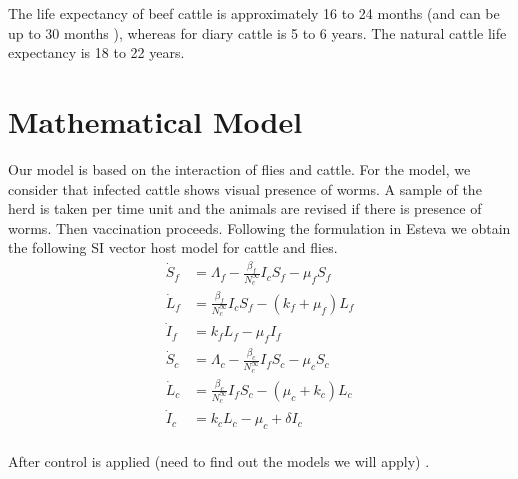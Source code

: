 \documentclass[preprint,12pt]{elsarticle}
\begin{document}
\noindent The life expectancy of beef cattle is approximately 16 to 24 months (and can be up to 30 months \cite{stanley:2003}), whereas for diary cattle is 5 to 6 years. The natural cattle life expectancy is 18 to 22 years.


\section{Mathematical Model}

\noindent Our model is based on the interaction of flies and cattle. For the model, we consider that infected cattle shows visual presence of worms. A sample of the herd is taken per time unit and the animals are revised if there is presence of worms. Then vaccination proceeds.  
Following the formulation in Esteva \cite{Esteva:1998} we obtain the 
following SI vector host model for cattle and flies.
\begin{equation}\label{Eq:SIvectorhostmodel}
\begin{aligned}
    \dot{S}_f&= 
        \Lambda_f-\frac{\beta_f}{N_c^{\infty}}I_cS_f-\mu_fS_f
    \\
    \dot{L}_f&= 
        \frac{\beta_f}{N_c^{\infty}}I_cS_f-\left(k_f+\mu_f\right)L_f
    \\
    \dot{I}_f&= 
        k_f L_f-\mu_fI_f
    \\
    \dot{S}_c&= 
        \Lambda_c-\frac{\beta_c}{N_c^{\infty}}I_fS_c-\mu_cS_c
    \\
    \dot{L}_c&= 
        \frac{\beta_c}{N_c^{\infty}}I_fS_c-\left(\mu_c+k_c\right)L_c
    \\
    \dot{I}_c&= k_c L_c-\mu_c +\delta I_c
    \\
\end{aligned}
\end{equation}

\noindent After control is applied (need to find out the models we will apply)
\cite{manjunath2016prevalence}.
\end{document}

